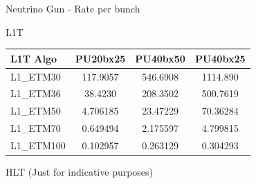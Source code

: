 \documentclass[8pt]{beamer}
\begin{document}
\begin{frame}{Neutrino Gun - Rate per bunch}

\begin{block}{L1T}
\centering

\begin{tabular}{|l|c|c|c|}
\hline
L1T Algo   & PU20bx25 & PU40bx50 & PU40bx25 \\
\hline \hline
L1\_ETM30  & 117.9057 & 546.6908 & 1114.890 \\                                                                                                                                                                                                                                                        
L1\_ETM36  & 38.4230  & 208.3502 & 500.7619 \\                                                                                                                                                                                                                                                       
L1\_ETM50  & 4.706185 & 23.47229 & 70.36284 \\                                                                                                                                                                                                                                                      
L1\_ETM70  & 0.649494 & 2.175597 & 4.799815 \\
L1\_ETM100 & 0.102957 & 0.263129 & 0.304293 \\                                                                                                                                                                                                                   
\hline
\end{tabular}

\end{block}

\begin{block}{HLT (Just for indicative purposes)}
 

\end{block}
\end{frame}
\end{document}
